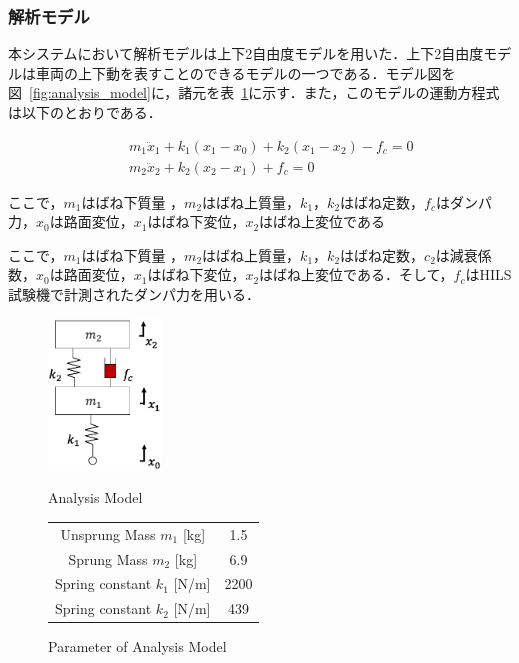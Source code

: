 \documentclass[a4paper,12pt]{article_vdlab_sotsuron}
\begin{document}
\newpage
\subsubsection{解析モデル}
本システムにおいて解析モデルは上下2自由度モデルを用いた．上下2自由度モデルは車両の上下動を表すことのできるモデルの一つである\cite{carbody_model}．モデル図を図~\ref{fig:analysis_model}に，諸元を表~\ref{tab:carbody_parameter}に示す．また，このモデルの運動方程式は以下のとおりである．

\begin{eqnarray}
 \label{eq:2dof_m1} &&m_1\ddot x_1 + k_1(x_1-x_0) + k_2(x_1-x_2) - f_c = 0\\
 \label{eq:2dof_m2} &&m_2\ddot x_2 + k_2(x_2-x_1) + f_c = 0
\end{eqnarray}

ここで，$m_1$はばね下質量 ，$m_2$はばね上質量，$k_1$，$k_2$はばね定数，$f_c$はダンパ力，$x_0$は路面変位，$x_1$はばね下変位，$x_2$はばね上変位である

\vspace{10mm}
ここで，$m_1$はばね下質量 ，$m_2$はばね上質量，$k_1$，$k_2$はばね定数，$c_2$は減衰係数，$x_0$は路面変位，$x_1$はばね下変位，$x_2$はばね上変位である．そして，$f_c$はHILS試験機で計測されたダンパ力を用いる．

\vspace*{10mm}
\begin{figure}[htp]
  \begin{minipage}{0.5\textwidth}
    \begin{center}
      \includegraphics[height=40mm]{figure/analysis_model.eps}
      \vspace*{3mm}
      \caption{Analysis Model}
      \label{fig:analysis_model}
    \end{center}
  \end{minipage}
  \begin{minipage}{0.5\textwidth}
      \begin{center}
	\makeatletter
	\def\@captype{table}
	\makeatother
	\caption{Parameter of Analysis Model}
	\label{tab:carbody_parameter}
	  \begin{tabular}{cc}\hline
	    Unsprung Mass $m_1$ [kg] & 1.5\\
	    Sprung Mass $m_2$ [kg] & 6.9\\
	    Spring constant $k_1$ [N/m] & 2200\\
	    Spring constant $k_2$ [N/m] & 439\\\hline
	  \end{tabular}
	\end{center}
  \end{minipage}
\end{figure}
\end{document}
